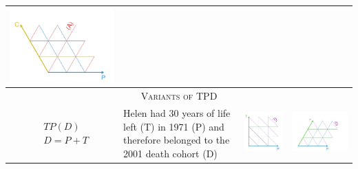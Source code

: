 \documentclass[12pt,oneside,a4paper]{article} %
\begin{document}
\begin{longtable}{m{}m{}m{}m{}}
  \includegraphics[scale=.5]{Figures/DiagramTable/CP_iso.pdf}  \\
  \midrule
  \multicolumn{4}{c}{\textsc{Variants of TPD}} \\
  \midrule
  $$\begin{aligned}
    &TP(D) \\
    &D = P + T
  \end{aligned}$$ &
  Helen had 30 years of life left (T) in 1971 (P) and therefore belonged to the 2001 death cohort (D) &
  \includegraphics[scale=.5]{Figures/DiagramTable/TP_rt.pdf} &
  \includegraphics[scale=.5]{Figures/DiagramTable/TP_iso.pdf}  \\

\end{longtable}
\end{document}
